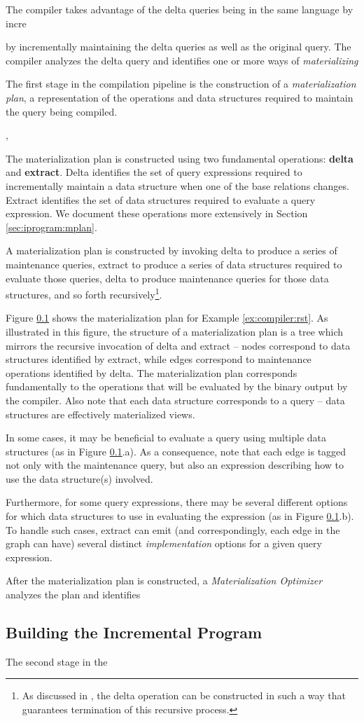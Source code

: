 The compiler takes advantage of the delta queries being in the same language by incre


 by incrementally maintaining the delta queries as well as the original query.  The compiler analyzes the delta query and identifies one or more ways of {\em materializing}


The first stage in the compilation pipeline is the construction of a {\em materialization plan}, a representation of the operations and data structures required to maintain the query being compiled.  


 \cite{dbtoaster-cidr}, 


The materialization plan is constructed using two fundamental operations: {\bf delta} and {\bf extract}.  Delta identifies the set of query expressions required to incrementally maintain a data structure when one of the base relations changes.  Extract identifies the set of data structures required to evaluate a query expression.  We document these operations more extensively in Section \ref{sec:iprogram:mplan}. 

A materialization plan is constructed by invoking delta to produce a series of maintenance queries, extract to produce a series of data structures required to evaluate those queries, delta to produce maintenance queries for those data structures, and so forth recursively\footnote{As discussed in \cite{dbtoaster-pods}, the delta operation can be constructed in such a way that guarantees termination of this recursive process.}.  

Figure \ref{} shows the materialization plan for Example \ref{ex:compiler:rst}.  As illustrated in this figure, the structure of a materialization plan is a tree which mirrors the recursive invocation of delta and extract -- nodes correspond to data structures identified by extract, while edges correspond to maintenance operations identified by delta.  The materialization plan corresponds fundamentally to the operations that will be evaluated by the binary output by the compiler.  Also note that each data structure corresponds to a query -- data structures are effectively materialized views.  

In some cases, it may be beneficial to evaluate a query using multiple data structures (as in Figure \ref{}.a).  As a consequence, note that each edge is tagged not only with the maintenance query, but also an expression describing how to use the data structure(s) involved.

Furthermore, for some query expressions, there may be several different options for which data structures to use in evaluating the expression (as in Figure \ref{}.b).  To handle such cases, extract can emit (and correspondingly, each edge in the graph can have) several distinct {\em implementation} options for a given query expression.  

After the materialization plan is constructed, a {\em Materialization Optimizer} analyzes the plan and identifies 

\subsection{Building the Incremental Program}
The second stage in the 
